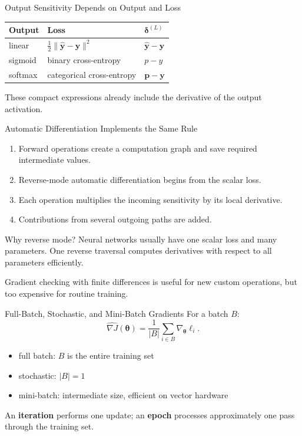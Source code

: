 \documentclass[10pt,aspectratio=169]{ntuabeamer}
\begin{document}
\begin{frame}{Output Sensitivity Depends on Output and Loss}
  \centering
  \begin{tabular}{lll}
    \toprule
    Output & Loss & $\boldsymbol\delta^{(L)}$ \\
    \midrule
    linear & $\tfrac12\lVert\hat{\mathbf y}-\mathbf y\rVert^2$ & $\hat{\mathbf y}-\mathbf y$ \\
    sigmoid & binary cross-entropy & $p-y$ \\
    softmax & categorical cross-entropy & $\mathbf p-\mathbf y$ \\
    \bottomrule
  \end{tabular}
  \par
  \vspace{0.45cm}
  These compact expressions already include the derivative of the output activation.
\end{frame}

\begin{frame}{Automatic Differentiation Implements the Same Rule}
  \begin{enumerate}
    \item Forward operations create a computation graph and save required intermediate values.
    \item Reverse-mode automatic differentiation begins from the scalar loss.
    \item Each operation multiplies the incoming sensitivity by its local derivative.
    \item Contributions from several outgoing paths are added.
  \end{enumerate}
  \begin{block}{Why reverse mode?}
    Neural networks usually have one scalar loss and many parameters. One reverse traversal computes derivatives with respect to all parameters efficiently.
  \end{block}
  Gradient checking with finite differences is useful for new custom operations, but too expensive for routine training.
\end{frame}


\begin{frame}{Full-Batch, Stochastic, and Mini-Batch Gradients}
  For a batch $B$:
  \[
    \widehat{\nabla J}(\boldsymbol\theta)
    =\frac{1}{|B|}\sum_{i\in B}\nabla_{\boldsymbol\theta}\ell_i.
  \]
  \begin{itemize}
    \item full batch: $B$ is the entire training set
    \item stochastic: $|B|=1$
    \item mini-batch: intermediate size, efficient on vector hardware
  \end{itemize}
  An \textbf{iteration} performs one update; an \textbf{epoch} processes approximately one pass through the training set.
\end{frame}
\end{document}
